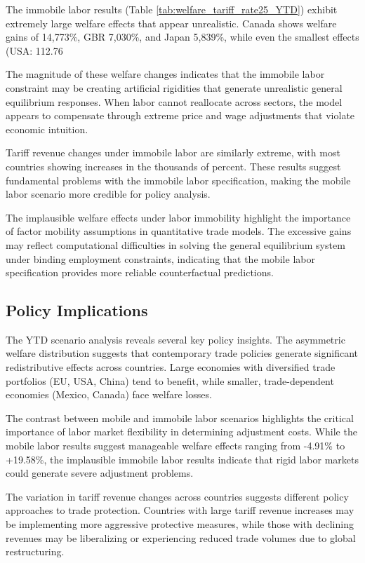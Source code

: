 The immobile labor results (Table \ref{tab:welfare_tariff_rate25_YTD}) exhibit extremely large welfare effects that appear unrealistic. Canada shows welfare gains of 14,773\%, GBR 7,030\%, and Japan 5,839\%, while even the smallest effects (USA: 112.76%

The magnitude of these welfare changes indicates that the immobile labor constraint may be creating artificial rigidities that generate unrealistic general equilibrium responses. When labor cannot reallocate across sectors, the model appears to compensate through extreme price and wage adjustments that violate economic intuition.

Tariff revenue changes under immobile labor are similarly extreme, with most countries showing increases in the thousands of percent. These results suggest fundamental problems with the immobile labor specification, making the mobile labor scenario more credible for policy analysis.

The implausible welfare effects under labor immobility highlight the importance of factor mobility assumptions in quantitative trade models. The excessive gains may reflect computational difficulties in solving the general equilibrium system under binding employment constraints, indicating that the mobile labor specification provides more reliable counterfactual predictions.

\subsection{Policy Implications}

The YTD scenario analysis reveals several key policy insights. The asymmetric welfare distribution suggests that contemporary trade policies generate significant redistributive effects across countries. Large economies with diversified trade portfolios (EU, USA, China) tend to benefit, while smaller, trade-dependent economies (Mexico, Canada) face welfare losses.

The contrast between mobile and immobile labor scenarios highlights the critical importance of labor market flexibility in determining adjustment costs. While the mobile labor results suggest manageable welfare effects ranging from -4.91\% to +19.58\%, the implausible immobile labor results indicate that rigid labor markets could generate severe adjustment problems.

The variation in tariff revenue changes across countries suggests different policy approaches to trade protection. Countries with large tariff revenue increases may be implementing more aggressive protective measures, while those with declining revenues may be liberalizing or experiencing reduced trade volumes due to global restructuring.
